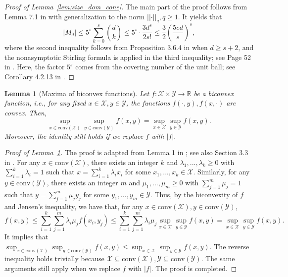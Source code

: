 \documentclass[ejsv2,noshowframe]{imsart}
\theoremstyle{plain}
\newtheorem{lemma}[theorem]{Lemma}
\theoremstyle{definition}
\theoremstyle{remark}
\newcommand{\norm}[1]{\left|\left| #1 \right|\right|}
\begin{document}
\begin{proof}[Proof of Lemma~\ref{lem:size_dom_cone}]
	The main part of the proof follows from Lemma 7.1 in \cite{koltchinskii2011oracle} with generalization to the norm $\norm{\cdot}_q, q\geq 1$. It yields that
	$$|M_d| \leq 5^s \sum_{k=0}^s \binom{d}{k} \leq 5^s \cdot\frac{3 d^s}{2s!} \leq \frac{3}{2}\left(\frac{5ed}{s} \right)^s,$$
	where the second inequality follows from Proposition 3.6.4 in \cite{gine2021mathematical} when $d\geq s+2$, and the nonasymptotic Stirling formula is applied in the third inequality; see Page 52 in \cite{feller1968prob}. Here, the factor $5^s$ comes from the covering number of the unit ball; see Corollary 4.2.13 in \cite{vershynin2018high}.
\end{proof}

\vspace{3mm}

\begin{lemma}[Maxima of biconvex functions]
	\label{lem:max_biconvex}
	Let $f: \mathcal{X} \times \mathcal{Y} \to \mathbb{R}$ be a biconvex function, \emph{i.e.}, for any fixed $x\in \mathcal{X}, y\in \mathcal{Y}$, the functions $f(\cdot,y), f(x,\cdot)$ are convex. Then, 
	$$\sup_{x\in \mathrm{conv}(\mathcal{X})} \sup_{y\in \mathrm{conv}(\mathcal{Y})} f(x,y) = \sup_{x\in \mathcal{X}} \sup_{y\in \mathcal{Y}} f(x,y).$$
	Moreover, the identity still holds if we replace $f$ with $|f|$.
\end{lemma}

\begin{proof}[Proof of Lemma~\ref{lem:max_biconvex}]
	The proof is adapted from Lemma 1 in \cite{geng2000robust}; see also Section 3.3 in \citet{gorski2007biconvex}. For any $x\in \mathrm{conv}(\mathcal{X})$, there exists an integer $k$ and $\lambda_1,...,\lambda_k \geq 0$ with $\sum_{i=1}^k \lambda_i=1$ such that $x=\sum_{i=1}^k \lambda_ix_i$ for some $x_1,...,x_k \in \mathcal{X}$. Similarly, for any $y\in \mathrm{conv}(\mathcal{Y})$, there exists an integer $m$ and $\mu_1,...,\mu_m\geq 0$ with $\sum_{j=1}^m \mu_j=1$ such that $y=\sum_{j=1}^m \mu_j y_j$ for some $y_1,...,y_m \in \mathcal{Y}$. Thus, by the biconvexity of $f$ and Jensen's inequality, we have that, for any $x\in \mathrm{conv}(\mathcal{X}), y\in \mathrm{conv}(\mathcal{Y})$,
	$$f(x,y)\leq \sum_{i=1}^k \sum_{j=1}^m \lambda_i \mu_j f(x_i,y_j) \leq \sum_{i=1}^k \sum_{j=1}^m \lambda_i \mu_j \sup_{x\in \mathcal{X}} \sup_{y\in \mathcal{Y}} f(x,y) = \sup_{x\in \mathcal{X}} \sup_{y\in \mathcal{Y}} f(x,y).$$
	It implies that $\sup_{x\in \mathrm{conv}(\mathcal{X})}\sup_{y\in \mathrm{conv}(\mathcal{Y})} f(x,y) \leq \sup_{x\in \mathcal{X}} \sup_{y\in \mathcal{Y}} f(x,y)$. The reverse inequality holds trivially because $\mathcal{X} \subseteq \mathrm{conv}(\mathcal{X}), \mathcal{Y} \subseteq \mathrm{conv}(\mathcal{Y})$. The same arguments still apply when we replace $f$ with $|f|$. The proof is completed.
\end{proof}
\end{document}
